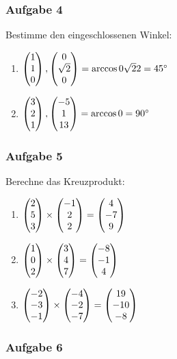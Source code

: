 	\subsubsection{Aufgabe 4}
	
		Bestimme den eingeschlossenen Winkel:
		
			\begin{enumerate}
				\item $\mvect{1\\1\\0},\mvect{0\\\sqrt{2}\\0} = \arccos{\frac{\sqrt{2}}{2}} = 45^\circ$
			    \item $\mvect{3\\2\\1},\mvect{-5\\1\\13} = \arccos{0} = 90^\circ$
			\end{enumerate}
	
	\subsubsection{Aufgabe 5}
		
		Berechne das Kreuzprodukt:
				
			\begin{enumerate}
			    \item $\mvect{2\\5\\3} \times \mvect{-1\\2\\2} = \mvect{4\\-7\\9}$
				\item $\mvect{1\\0\\2} \times \mvect{3\\4\\7} = \mvect{-8\\-1\\4}$
			    \item $\mvect{-2\\-3\\-1} \times \mvect{-4\\-2\\-7} = \mvect{19\\-10\\-8}$
			\end{enumerate}
		
	\subsubsection{Aufgabe 6}
		
